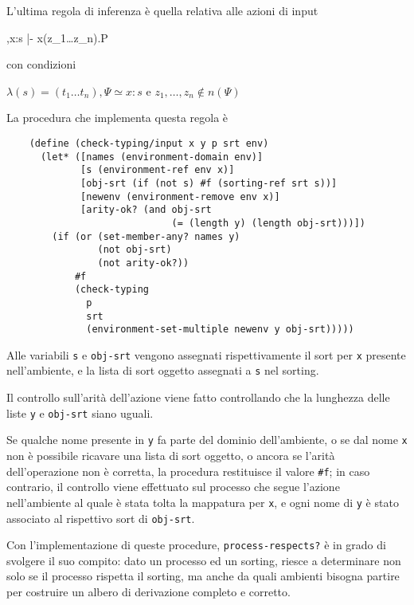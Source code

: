 L'ultima regola di inferenza \`e quella relativa alle azioni di input

\begin{pilisting}
      {\Psi,x:s |- x(z_1\ldots z_n).P}
\end{pilisting}

con condizioni

\begin{pilisting}
$
    \lambda(s) = (t_1\ldots t_n),
    \Psi \simeq x : s$ e $z_1,\ldots,z_n \notin n(\Psi)
$
\end{pilisting}

La procedura che implementa questa regola \`e

\begin{lstlisting}
    (define (check-typing/input x y p srt env)
      (let* ([names (environment-domain env)]
             [s (environment-ref env x)]
             [obj-srt (if (not s) #f (sorting-ref srt s))]
             [newenv (environment-remove env x)]
             [arity-ok? (and obj-srt
                             (= (length y) (length obj-srt)))])
        (if (or (set-member-any? names y)
                (not obj-srt)
                (not arity-ok?))
            #f
            (check-typing
              p
              srt
              (environment-set-multiple newenv y obj-srt)))))
\end{lstlisting}

Alle variabili \lstinline{s} e \lstinline{obj-srt} vengono assegnati
rispettivamente il sort per \lstinline{x} presente nell'ambiente, e la
lista di sort oggetto assegnati a \lstinline{s} nel sorting.

Il controllo sull'arit\`a dell'azione viene fatto controllando che la
lunghezza delle liste \lstinline{y} e \lstinline{obj-srt} siano uguali.

Se qualche nome presente in \lstinline{y} fa parte del dominio
dell'ambiente, o se dal nome \lstinline{x} non \`e possibile ricavare
una lista di sort oggetto, o ancora se l'arit\`a dell'operazione non
\`e corretta, la procedura restituisce il valore \lstinline{#f}; in
caso contrario, il controllo viene effettuato sul processo che segue
l'azione nell'ambiente al quale \`e stata tolta la mappatura per
\lstinline{x}, e ogni nome di \lstinline{y} \`e stato associato al
rispettivo sort di \lstinline{obj-srt}.

Con l'implementazione di queste procedure, \lstinline{process-respects?}
\`e in grado di svolgere il suo compito: dato un processo ed un sorting,
riesce a determinare non solo se il processo rispetta il sorting, ma
anche da quali ambienti bisogna partire per costruire un albero di
derivazione completo e corretto.
